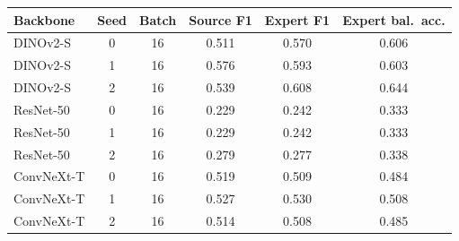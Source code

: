 \begin{tabular}{@{}lccccc@{}}\toprule
Backbone & Seed & Batch & Source F1 & Expert F1 & Expert bal.\ acc.\\\midrule
DINOv2-S & 0 & 16 & 0.511 & 0.570 & 0.606\\
DINOv2-S & 1 & 16 & 0.576 & 0.593 & 0.603\\
DINOv2-S & 2 & 16 & 0.539 & 0.608 & 0.644\\
ResNet-50 & 0 & 16 & 0.229 & 0.242 & 0.333\\
ResNet-50 & 1 & 16 & 0.229 & 0.242 & 0.333\\
ResNet-50 & 2 & 16 & 0.279 & 0.277 & 0.338\\
ConvNeXt-T & 0 & 16 & 0.519 & 0.509 & 0.484\\
ConvNeXt-T & 1 & 16 & 0.527 & 0.530 & 0.508\\
ConvNeXt-T & 2 & 16 & 0.514 & 0.508 & 0.485\\
\bottomrule\end{tabular}
